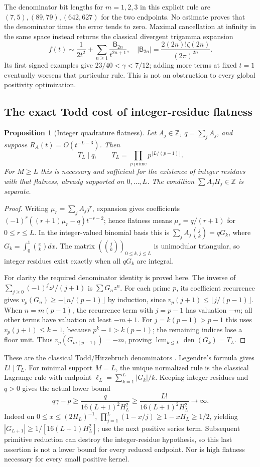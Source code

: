 \documentclass[11pt,a4paper]{article}
\newcommand{\Z}{\mathbb Z}
\newtheorem{proposition}[theorem]{Proposition}
\theoremstyle{definition}
\theoremstyle{remark}
\numberwithin{equation}{section}
\begin{document}
The denominator bit lengths for $m=1,2,3$ in this explicit rule are
$(7,5),(89,79),(642,627)$ for the two endpoints.  No estimate proves that
the denominator times the error tends to zero.  Maximal cancellation at
infinity in the same space instead returns the classical divergent
trigamma expansion
\[
 f(t)\sim\frac1{2t^2}+\sum_{n\ge1}\frac{\mathsf B_{2n}}{t^{2n+1}},
 \quad |\mathsf B_{2n}|=\frac{2(2n)!\zeta(2n)}{(2\pi)^{2n}}.
\]
Its first signed examples give $23/40<\gamma<7/12$; adding more terms at
fixed $t=1$ eventually worsens that particular rule.  This is not an
obstruction to every global positivity optimization.

\subsection{The exact Todd cost of integer-residue flatness}
\begin{proposition}[Integer quadrature flatness]
\label{ar:toddflat}
Let $A_j\in\Z$, $q=\sum_jA_j$, and suppose
$R_A(t)=O(t^{-L-3})$.  Then
\[
 T_L\mid q,\qquad T_L=\prod_{p\text{ prime}}p^{\lfloor L/(p-1)\rfloor}.
\]
For $M\ge L$ this is necessary and sufficient for the existence of integer
residues with that flatness, already supported on $0,\ldots,L$.
The condition $\sum A_jH_j\in\Z$ is separate.
\end{proposition}
\begin{proof}
Writing $\mu_r=\sum_jA_jj^r$, expansion gives coefficients
$(-1)^r((r+1)\mu_r-q)t^{-r-2}$; hence flatness means
$\mu_r=q/(r+1)$ for $0\le r\le L$.  In the integer-valued binomial basis
this is $\sum_jA_j\binom jk=qG_k$, where
$G_k=\int_0^1\binom xk dx$.
The matrix $(\binom jk)_{0\le k,j\le L}$ is unimodular triangular, so
integer residues exist exactly when all $qG_k$ are integral.

For clarity the required denominator identity is proved here.  The inverse
of $\sum_{j\ge0}(-1)^jz^j/(j+1)$ is $\sum G_nz^n$.
For each prime $p$, its coefficient recurrence gives
$v_p(G_n)\ge-\lfloor n/(p-1)\rfloor$ by induction, since
$v_p(j+1)\le\lfloor j/(p-1)\rfloor$.
When $n=m(p-1)$, the recurrence term with $j=p-1$ has valuation $-m$;
all other terms have valuation at least $-m+1$.
For $j=k(p-1)>p-1$ this uses $v_p(j+1)\le k-1$, because
$p^k-1>k(p-1)$; the remaining indices lose a floor unit.
Thus $v_p(G_{m(p-1)})=-m$, proving
$\operatorname{lcm}_{k\le L}\operatorname{den}(G_k)=T_L$.
\end{proof}
These are the classical Todd/Hirzebruch denominators
\cite{pm:BuchstaberVeselov2024}.  Legendre's formula gives $L!\mid T_L$.
For minimal support $M=L$, the unique normalized rule is the classical
Lagrange rule with endpoint $\ell_L=\sum_{k=1}^L|G_k|/k$.
Keeping integer residues and $q>0$ gives the actual lower bound
\[
 q\gamma-p\ge\frac{q}{16(L+1)^2H_L^2}
 \ge\frac{L!}{16(L+1)^2H_L^2}\longrightarrow\infty.
\]
Indeed on $0\le x\le(2H_L)^{-1}$,
$\prod_{j=1}^L(1-x/j)\ge1-xH_L\ge1/2$, yielding
$|G_{L+1}|\ge1/[16(L+1)H_L^2]$; use the next positive series term.
Subsequent primitive reduction can destroy the integer-residue hypothesis,
so this last assertion is not a lower bound for every reduced endpoint.
Nor is high flatness necessary for every small positive kernel.
\end{document}

